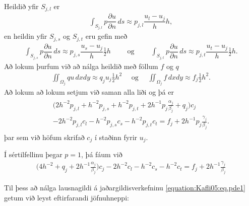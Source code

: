 \documentclass[a4paper,10pt,icelandic]{sphinxmanual}
\begin{document}
Heildið yfir \(S_{j,l}\) er
\begin{equation*}
\begin{split}\int_{S_{j,l}} p\dfrac{\partial u}{\partial n} \, ds
\approx p_{j,l}\dfrac {u_l-u_j} h h,\end{split}
\end{equation*}
en heildin yfir \(S_{j,s}\) og \(S_{j,t}\) eru gefin með
\begin{equation*}
\begin{split}\int_{S_{j,s}} p\dfrac{\partial u}{\partial n} \, ds
\approx p_{j,s}\dfrac{u_s-u_j}h\tfrac 12 h
\qquad \text{ og }  \qquad
\int_{S_{j,t}} p\dfrac{\partial u}{\partial n} \, ds
\approx p_{j,t}\dfrac{u_t-u_j}h\tfrac 12 h.\end{split}
\end{equation*}
Að lokum þurfum við að nálga heildið með föllum \(f\) og \(q\)
\begin{equation*}
\begin{split}\iint_{\Omega_j} q u\, dxdy
\approx q_ju_j \tfrac 12 h^2
\quad \text{ og } \quad
\iint_{\Omega_j} f\, dxdy
\approx f_j \tfrac 12 h^2.\end{split}
\end{equation*}
Að lokum að lokum setjum við saman alla liði og þá er
\begin{equation}\label{equation:Kafli05:eq.approx2}
\begin{split}\begin{gathered}
\big(2h^{-2}p_{j,l}+h^{-2}p_{j,s}+h^{-2}p_{j,t}
+2h^{-1}p_j\tfrac{\alpha_j}{\beta_j}+q_j\big)c_j
\\
-2h^{-2}p_{j,l}c_l-h^{-2}p_{j,s}c_s-h^{-2}p_{j,t}c_t
=f_j+2h^{-1}p_j\tfrac{\gamma_j}{\beta_j}.
\end{gathered}\end{split}
\end{equation}
þar sem við höfum skrifað \(c_j\) í staðinn fyrir \(u_j\).

Í sértilfellinu þegar \(p=1\), þá fáum við
\begin{equation}\label{equation:Kafli05:eq.approx2s}
\begin{split}\big(4h^{-2}
+q_j+2h^{-1}\tfrac{\alpha_j}{\beta_j}\big)c_j
-2h^{-2}c_l-h^{-2}c_s-h^{-2}c_t
=f_j+2h^{-1}\tfrac{\gamma_j}{\beta_j}\end{split}
\end{equation}

Til þess að nálga lausnagildi á jaðargildisverkefninu \eqref{equation:Kafli05:eq.pde1} getum við leyst eftirfarandi  jöfnuhneppi:
\end{document}

